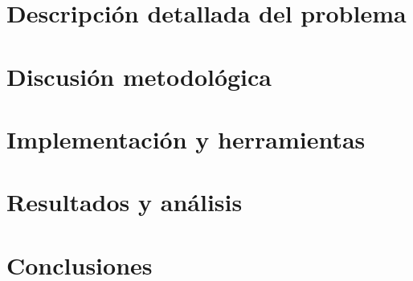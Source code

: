 \documentclass[pdftex,spanish]{pucthesis}
\begin{document}
\chapter{Descripción detallada del problema} \label{ch:problema}


\chapter{Discusión metodológica} \label{ch:metodologia}


\chapter{Implementación y herramientas} \label{ch:implementacion}


\chapter{Resultados y análisis} \label{ch:resultados}


\chapter{Conclusiones} \label{ch:conclusiones}


\cleardoublepage

\renewcommand{\bibname}{REFERENCIAS}



\appendix
\renewcommand{\thesection}{\arabic{section}}

\end{document}

